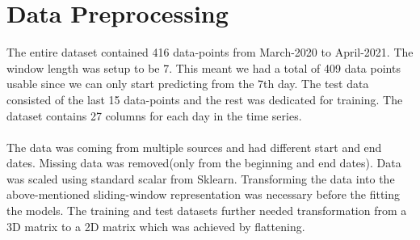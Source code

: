 \documentclass[12pt,a4paper]{article}
\begin{document}
\section*{Data Preprocessing}
The entire dataset contained 416 data-points from March-2020 to April-2021. The window 
length was setup to be 7. This meant we had a total of 409 data points usable since we can 
only start predicting from the 7th day. The test data consisted of the last 15 data-points and the
rest was dedicated for training.
The dataset contains 27 columns for each day in the time series.
\\\\
The data was coming from multiple sources and had different
start and end dates. Missing data was removed(only from the beginning and end dates). Data was scaled
using standard scalar from Sklearn. Transforming the data into the above-mentioned sliding-window
representation was necessary before the fitting the models.
The training and test datasets further needed transformation from a 3D matrix to a 2D matrix
which was achieved by flattening.
\end{document}
